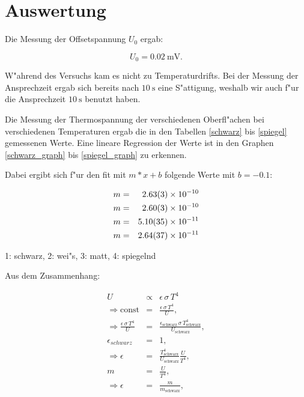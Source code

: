 \section{Auswertung}
	\label{sec:auswertung}

	Die Messung der Offsetspannung $U_0$ ergab:

	\begin{equation*}
		U_0 = \SI{0.02}{\milli\volt}.
	\end{equation*}

	W"ahrend des Versuchs kam es nicht zu Temperaturdrifts.
	Bei der Messung der Ansprechzeit ergab sich bereits nach $\SI{10}{\second}$ eine S"attigung, 
	weshalb wir auch f"ur die An\-sprech\-zeit $\SI{10}{\second}$ benutzt haben.

	Die Messung der Thermospannung der verschiedenen Oberfl"achen bei verschiedenen Temperaturen ergab die in den Tabellen \eqref{schwarz} bis \eqref{spiegel} gemessenen Werte. Eine lineare Regression der Werte ist in den Graphen \eqref{schwarz_graph} bis \eqref{spiegel_graph} zu erkennen.

	Dabei ergibt sich f"ur den fit mit $m*x+b$ folgende Werte mit $b = -0.1$:

	\begin{eqnarray}
		m &=& \SI{2.63 (3) e-10}{}\\
		m &=& \SI{2.60 (3) e-10}{}\\
		m &=& \SI{5.10 (35) e-11}{}\\
		m &=& \SI{2.64 (37) e-11}{}
	\end{eqnarray}

	\begin{center}
			\tiny{1: schwarz, 2: wei"s, 3: matt, 4: spiegelnd}
	\end{center}

	Aus dem Zusammenhang:

	\begin{eqnarray*}
		U &\propto& \epsilon\,\sigma\,T^4\\
		\Rightarrow \mathrm{const} &=& \frac{\epsilon\,\sigma\,T^4}{U},\\
		\Rightarrow \frac{\epsilon\,\sigma\,T^4}{U} &=& \frac{\epsilon_\mathrm{schwarz}\,\sigma\,T^4_\mathrm{schwarz}}{U_\mathrm{schwarz}},\\
		\epsilon_{schwarz} &=& 1,\\
		\Rightarrow \epsilon &=& \frac{T^4_\mathrm{schwarz}}{U_\mathrm{schwarz}} \frac{U}{T^4},\\
		m &=& \frac{U}{T^4},\\
		\Rightarrow \epsilon &=& \frac{m}{m_\mathrm{schwarz}},
	\end{eqnarray*}

